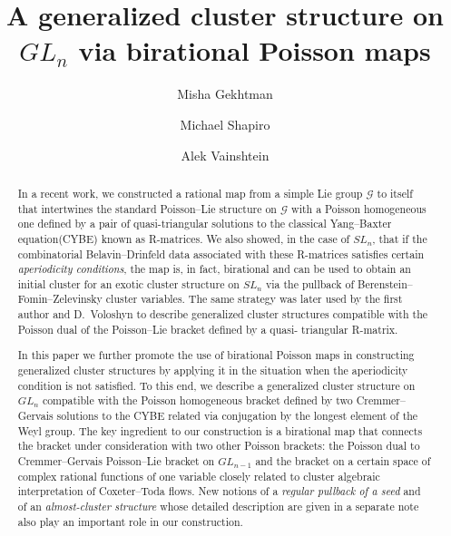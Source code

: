 \documentclass{amsart}
\theoremstyle{definition}
\theoremstyle{remark}
\numberwithin{equation}{section}
\numberwithin{theorem}{section}
\def\G{{\mathcal G}}
\begin{document}
\title{A generalized cluster structure on $GL_n$ via birational Poisson maps}





\author{Misha Gekhtman}


\address{Department of Mathematics, University of Notre Dame, Notre Dame,
IN 46556}

\author{Michael Shapiro}
\address{Department of Mathematics, Michigan State University, East Lansing,
MI 48823}


\author{Alek Vainshtein}
\address{Department of Mathematics \& Department of Computer Science, University of Haifa, Haifa,
Mount Carmel 31905, Israel}

\begin{abstract}
In a recent work, we constructed a rational map from a simple Lie group $\G$ to itself that intertwines the standard 
Poisson--Lie structure on $\G$ with a Poisson homogeneous one defined by a pair of quasi-triangular solutions to the classical Yang--Baxter equation(CYBE) known as R-matrices. We also showed, in the case of $SL_n$, that if the combinatorial Belavin--Drinfeld data associated with these R-matrices satisfies certain {\em aperiodicity conditions}, the map is, in fact, birational and can be used to obtain an initial cluster for an exotic cluster structure on $SL_n$ via the pullback of Berenstein--Fomin--Zelevinsky cluster variables. The same strategy was later used by the first author and 
D.~Voloshyn to describe generalized cluster structures 
compatible with the Poisson dual of the Poisson--Lie bracket defined by a quasi-
triangular R-matrix.

In this paper we further promote the use of birational Poisson maps in constructing generalized cluster structures by applying it in the situation when the aperiodicity condition is not satisfied. To this end, we describe a generalized cluster structure on $GL_n$ compatible with the Poisson homogeneous bracket defined by 
two Cremmer--Gervais solutions to the
CYBE related via conjugation by the longest element of the Weyl group. The key ingredient to our construction is a birational map that 
connects the bracket under consideration with two other Poisson brackets: the Poisson dual 
to Cremmer--Gervais Poisson--Lie bracket on $GL_{n-1}$ and the bracket 
on a
certain space of complex rational functions of one variable closely related to cluster algebraic interpretation of 
Coxeter--Toda flows. New notions of a {\em 
regular pullback of a seed\/} and of an {\it almost-cluster structure\/} whose detailed description are given in a separate note also play an important role in our construction.
\end{abstract}
\end{document}

